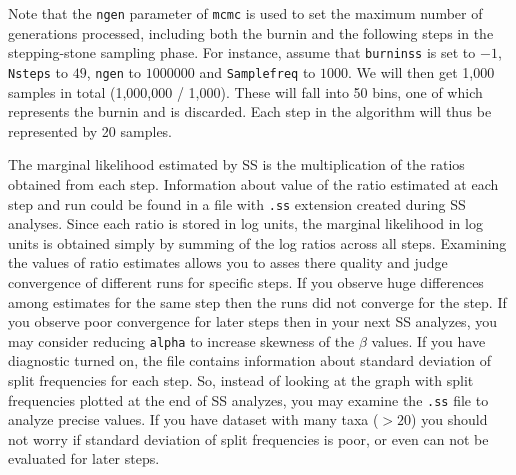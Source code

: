 \documentclass[12pt]{book}
\newcommand{\ttt}[1]{\texttt{#1}}
\begin{document}
Note that the \ttt{ngen} parameter of \ttt{mcmc} is used to set the maximum number of generations
processed, including both the burnin and the following steps in the stepping-stone sampling phase.
For instance, assume that \ttt{burninss} is set to $-1$, \ttt{Nsteps} to $49$, \ttt{ngen} to
$1000000$ and \ttt{Samplefreq} to $1000$. We will then get 1,000 samples in total (1,000,000 /
1,000). These will fall into 50 bins, one of which represents the burnin and is discarded. Each
step in the algorithm will thus be represented by 20 samples.

The marginal likelihood estimated by SS is the multiplication of the ratios obtained from each
step. Information about value of the ratio estimated at each step and run could be found in a file
with \ttt{.ss} extension created during SS analyses. Since each ratio is stored in log units, the
marginal likelihood in log units is obtained simply by summing of the log ratios across all steps.
Examining the values of ratio estimates allows you to asses there quality and judge convergence of
different runs for specific steps. If you observe huge differences among estimates for the same
step then the runs did not converge for the step. If you observe poor convergence for later steps
then in your next SS analyzes, you may consider reducing \ttt{alpha} to increase skewness of the
$\beta$ values. If you have diagnostic turned on, the file contains information about standard
deviation of split frequencies for each step. So, instead of looking at the graph with split
frequencies plotted at the end of SS analyzes, you may examine the \ttt{.ss} file to analyze
precise values. If you have dataset with many taxa ($>20$) you should not worry if standard
deviation of split frequencies is poor, or even can not be evaluated for later steps.

\end{document}
